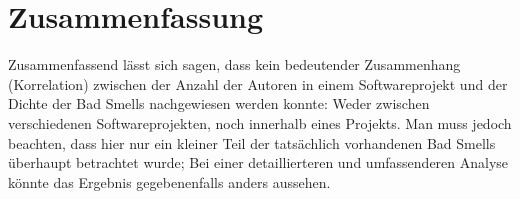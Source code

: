 \documentclass[12pt]{article}
\begin{document}
\section{Zusammenfassung}
Zusammenfassend lässt sich sagen, dass kein bedeutender Zusammenhang (Korrelation) zwischen der Anzahl der Autoren in einem Softwareprojekt und der Dichte der Bad Smells nachgewiesen werden konnte:
Weder zwischen verschiedenen Softwareprojekten, noch innerhalb eines Projekts.
Man muss jedoch beachten, dass hier nur ein kleiner Teil der tatsächlich vorhandenen Bad Smells überhaupt betrachtet wurde;
Bei einer detaillierteren und umfassenderen Analyse könnte das Ergebnis gegebenenfalls anders aussehen.




\end{document}

